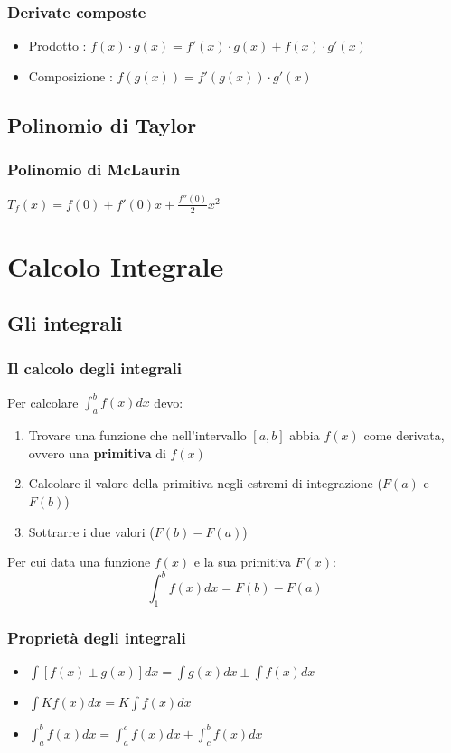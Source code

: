 \documentclass[12pt, a4paper, openany]{book}
\begin{document}
	\subsection{Derivate composte}
	\begin{itemize}
		\item Prodotto : $f(x) \cdot g(x) = f'(x) \cdot g(x) + f(x) \cdot g'(x)$
		\item Composizione : $f(g(x)) = f'(g(x)) \cdot g'(x)$
	\end{itemize}



	\section{Polinomio di Taylor}
	\subsection*{Polinomio di McLaurin}
$T_f(x) = f(0) + f'(0)x + \frac{f''(0)}{2}x^2$

	\chapter{Calcolo Integrale}
	\section{Gli integrali}
	\subsection{Il calcolo degli integrali}
	Per calcolare $\int_{a}^{b} f(x) dx$ devo:
	\begin{enumerate}
		\item Trovare una funzione che nell'intervallo $[a,b]$ abbia $f(x)$ come derivata, ovvero una \textbf{primitiva} di $f(x)$
		\item Calcolare il valore della primitiva negli estremi di integrazione ($F(a)$ e $F(b)$)
		\item Sottrarre i due valori ($F(b)-F(a)$)
	\end{enumerate}
	Per cui data una funzione $f(x)$ e la sua primitiva $F(x)$: $$\int_{1}^{b} f(x)dx = F(b)- F(a)$$


\subsection{Proprietà degli integrali}
\begin{itemize}
	\item $\int[f(x) \pm g(x)] dx = \int g(x) dx \pm \int f(x) dx$
	\item $\int K f(x) dx = K\int f(x) dx$
	\item $\int_{a}^{b} f(x) dx = \int_{a}^{c} f(x) dx + \int_{c}^{b} f(x) dx$
\end{itemize}
\end{document}
